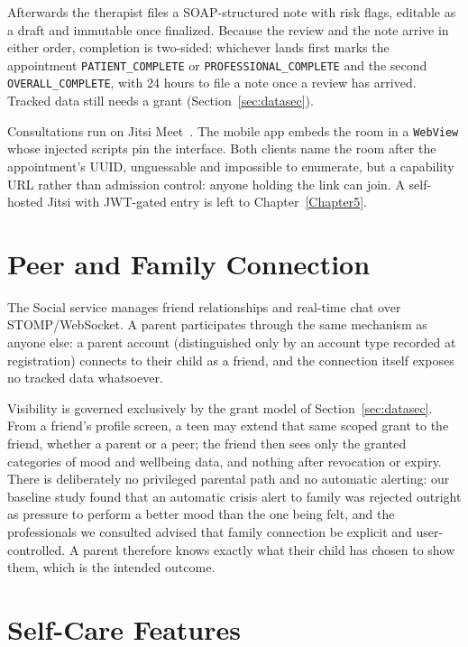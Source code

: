 Afterwards the therapist files a SOAP-structured note with risk flags, editable
as a draft and immutable once finalized. Because the review and the note arrive
in either order, completion is two-sided: whichever lands first marks the
appointment \texttt{PATIENT\_COMPLETE} or \texttt{PROFESSIONAL\_COMPLETE} and
the second \texttt{OVERALL\_COMPLETE}, with 24 hours to file a note once a
review has arrived. Tracked data
still needs a grant (Section~\ref{sec:datasec}).

Consultations run on Jitsi Meet~\cite{Jitsi}. The mobile app embeds the room in a
\texttt{WebView} whose injected scripts pin the interface. Both clients name the room after the appointment's UUID, unguessable
and impossible to enumerate, but a capability URL rather than admission
control: anyone holding the link can join. A self-hosted Jitsi with JWT-gated
entry is left to Chapter~\ref{Chapter5}.

\section{Peer and Family Connection}
\label{sec:social}

The Social service manages friend relationships and real-time chat over
STOMP/WebSocket. A parent participates through the same mechanism as anyone
else: a parent account (distinguished only by an account type recorded at
registration) connects to their child as a friend, and the connection itself
exposes no tracked data whatsoever.

Visibility is governed exclusively by the grant model of
Section~\ref{sec:datasec}. From a friend's profile screen, a teen may extend
that same scoped grant to the friend, whether a parent or a peer; the friend
then sees only the granted categories of mood and wellbeing data, and nothing
after revocation or expiry. There is deliberately no privileged parental path and
no automatic alerting: our baseline study found that an automatic crisis
alert to family was rejected outright as pressure to perform a better mood
than the one being felt, and the professionals we consulted advised that
family connection be explicit and user-controlled. A parent therefore knows
exactly what their child has chosen to show them, which is the intended outcome.

\section{Self-Care Features}
\label{sec:selfcare}

